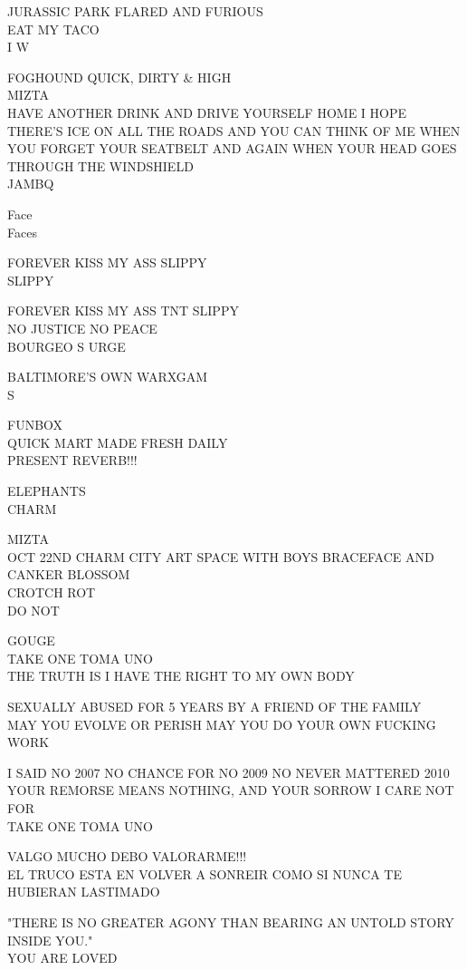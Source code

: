 \documentclass[10pt,letterpaper]{article}
\begin{document}
JURASSIC PARK FLARED AND FURIOUS\\
EAT MY TACO\\
I W

FOGHOUND QUICK, DIRTY \& HIGH\\
MIZTA\\
HAVE ANOTHER DRINK AND DRIVE YOURSELF HOME I HOPE THERE'S ICE ON ALL THE ROADS AND YOU CAN THINK OF ME WHEN YOU FORGET YOUR SEATBELT AND AGAIN WHEN YOUR HEAD GOES THROUGH THE WINDSHIELD\\
JAMBQ

Face\\
Faces

FOREVER KISS MY ASS SLIPPY\\
SLIPPY

FOREVER KISS MY ASS TNT SLIPPY\\
NO JUSTICE NO PEACE\\
BOURGEO S URGE

BALTIMORE'S OWN WARXGAM\\
S

FUNBOX\\
QUICK MART MADE FRESH DAILY\\
PRESENT REVERB!!!

ELEPHANTS\\
CHARM

MIZTA\\
OCT 22ND CHARM CITY ART SPACE WITH BOYS BRACEFACE AND CANKER BLOSSOM\\
CROTCH ROT\\
DO NOT

GOUGE\\
TAKE ONE TOMA UNO\\
THE TRUTH IS I HAVE THE RIGHT TO MY OWN BODY

SEXUALLY ABUSED FOR 5 YEARS BY A FRIEND OF THE FAMILY\\
MAY YOU EVOLVE OR PERISH MAY YOU DO YOUR OWN FUCKING WORK

I SAID NO 2007 NO CHANCE FOR NO 2009 NO NEVER MATTERED 2010\\
YOUR REMORSE MEANS NOTHING, AND YOUR SORROW I CARE NOT FOR\\
TAKE ONE TOMA UNO

VALGO MUCHO DEBO VALORARME!!!\\
EL TRUCO ESTA EN VOLVER A SONREIR COMO SI NUNCA TE HUBIERAN LASTIMADO

"THERE IS NO GREATER AGONY THAN BEARING AN UNTOLD STORY INSIDE YOU."\\
YOU ARE LOVED
\end{document}
